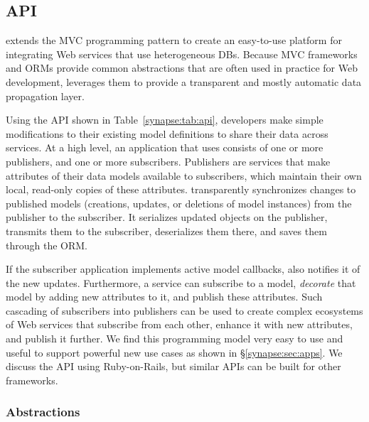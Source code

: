\setlength{\tabcolsep}{4pt}
\subsection{\synapse API}
\label{synapse:sec:programming-model}

\synapse extends the MVC programming pattern to create an
easy-to-use platform for integrating Web services that use
heterogeneous DBs.  
Because MVC frameworks and ORMs provide common abstractions that are
often used in practice for Web development, \synapse
leverages them to provide a transparent and mostly automatic data
propagation layer.

Using the \synapse API shown in Table~\ref{synapse:tab:api}, developers make
simple modifications to their existing model definitions to share their data
across services. At a high
level, an application that uses \synapse consists of one or more publishers,
and one or more subscribers. Publishers are services that make attributes of
their data models available to subscribers, which maintain their own local,
read-only copies of these attributes. \synapse transparently
synchronizes changes to published models (creations, updates, or deletions of
model instances) from the publisher to the subscriber.  It serializes
updated objects on the publisher, transmits them to the subscriber, deserializes
them there, and saves them through the ORM.

If the subscriber application implements active model callbacks,
\synapse also notifies it of the new updates.  Furthermore, a service can
subscribe to a model, \emph{decorate} that model by adding new
attributes to it, and publish these attributes. Such cascading
of subscribers into publishers can be used to create complex
ecosystems of Web services that subscribe from each other, enhance it
with new attributes, and publish it further.  We find this
programming model very easy to use and useful to support powerful new use
cases as shown in \S\ref{synapse:sec:apps}.
We discuss the \synapse API using Ruby-on-Rails, but similar APIs can be
built for other frameworks.

\subsubsection{\synapse Abstractions}
\label{synapse:sec:api}

\begingroup
\setlength{\columnsep}{6pt}

